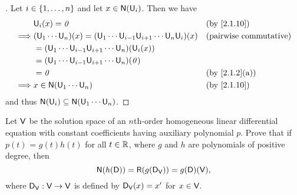 \begin{proof}[]
  Let \(i \in \left\lbrace1, \dots, n\right\rbrace\) and let \(x \in \ns{\U_i}\).
  Then we have
  \begin{align*}
             & \U_i(x) = \zv                                                                   &  & \by{2.1.10}                   \\
    \implies & (\U_1 \cdots \U_n)(x) = (\U_1 \cdots \U_{i - 1} \U_{i + 1} \cdots \U_n \U_i)(x) &  & \text{(pairwise commutative)} \\
             & = (\U_1 \cdots \U_{i - 1} \U_{i + 1} \cdots \U_n)(\U_i(x))                                                         \\
             & = (\U_1 \cdots \U_{i - 1} \U_{i + 1} \cdots \U_n)(\zv)                                                             \\
             & = \zv                                                                           &  & \by{2.1.2}[a]                 \\
    \implies & x \in \ns{\U_1 \cdots \U_n}                                                     &  & \by{2.1.10}
  \end{align*}
  and thus \(\ns{\U_i} \subseteq \ns{\U_1 \cdots \U_n}\).
\end{proof}

\setcounter{ex}{11}
\begin{ex}\label{ex:2.7.12}
  Let \(\mathsf{V}\) be the solution space of an \(n\)th-order homogeneous linear differential equation with constant coefficients having auxiliary polynomial \(p\).
  Prove that if \(p(t)\) = \(g(t) h(t)\) for all \(t \in \mathbb{R}\), where \(g\) and \(h\) are polynomials of positive degree, then
  \[
    \ns{h(\Dop)} = \rg{g(\Dop_{\V})} = g(\Dop)(\V),
  \]
  where \(\mathsf{D}_{\mathsf{V}} : \mathsf{V} \to \mathsf{V}\) is defined by \(\mathsf{D}_{\mathsf{V}}(x) = x'\) for \(x \in \mathsf{V}\).
\end{ex}

